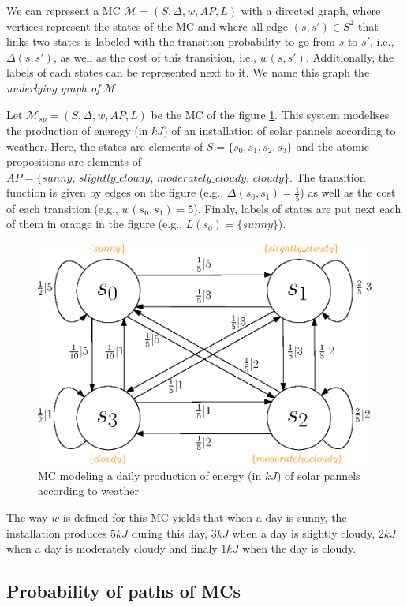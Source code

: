 We can represent a MC $\mathcal{M} = (S, \Delta, w, AP, L)$ with a directed graph, where vertices represent the states
of the MC and where all edge $(s, s') \in S^2$ that links two states is labeled with the transition probability to go from $s$ to $s'$, i.e., $\Delta(s, s')$, as well as the cost of this transition, i.e., $w(s, s')$. Additionally, the labels of each
states can be represented next to it. We name this graph the \textit{underlying graph of} $\mathcal{M}$.

\begin{example}\label{solar-pannel}
  Let $\mathcal{M}_{sp} = (S, \Delta, w, AP, L)$ be the MC of the figure \ref{MCexample}. This system modelises the production of eneregy (in $kJ$) of
  an installation of solar pannels according to weather.
  Here, the states are elements of $S = \{s_0, s_1, s_2, s_3\}$ and the atomic propositions are elements of $AP = \{sunny, \, slightly\_cloudy, \, moderately\_cloudy, \, cloudy \}$. The transition function is given by edges on the figure (e.g., $\Delta(s_0, s_1) = \frac{1}{5}$) as well as the
  cost of each transition (e.g., $w(s_0, s_1) = 5$). Finaly, labels of states
  are put next each of them in orange in the figure (e.g., $L(s_0) = \{sunny\}$).
  \begin{figure}[h!]
    \centering
    \includegraphics[width=0.6\linewidth]{resources/weather-solar-pannel}
    \caption{MC modeling a daily production of energy (in $kJ$) of solar pannels according to weather}
    \label{MCexample}
  \end{figure}
  The way $w$ is defined for this MC yields that when a day is sunny, the installation produces $5 kJ$ during this day, $3 kJ$ when a day is slightly cloudy, $2 kJ$ when a day is moderately cloudy and finaly $1 kJ$ when the day is cloudy.
\end{example}

\subsection{Probability of paths of MCs}

